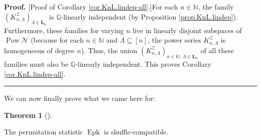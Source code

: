 \documentclass[numbers=enddot,12pt,final,onecolumn,notitlepage]{scrartcl}%
\theoremstyle{definition}
\newtheorem{theo}{Theorem}[section]
\newenvironment{theorem}[1][]
{\begin{theo}[#1]\begin{leftbar}}
{\end{leftbar}\end{theo}}
\newenvironment{proof}[1][Proof]{\noindent\textbf{#1.} }{\ \rule{0.5em}{0.5em}}
\newenvironment{verlong}{}{}
\newcommand{\NN}{\mathbb{N}}
\begin{document}
\begin{verlong}
\begin{proof}
[Proof of Corollary \ref{cor.KnL.lindep-all}.]For each $n\in\mathbb{N}$, the
family
$\left(  K_{n,\Lambda}^{\mathcal{Z}}\right)  _{\Lambda\in \mathbf{L}_n}$
is $\mathbb{Q}$-linearly
independent (by Proposition \ref{prop.KnL.lindep}). Furthermore, these
families for varying $n$ live in linearly disjoint subspaces of
$\operatorname*{Pow}\mathcal{N}$ (because for each $n \in \NN$ and $\Lambda
\subseteq\left[  n\right]  $, the power series $K_{n,\Lambda}^{\mathcal{Z}}$
is homogeneous of degree $n$). Thus, the union $\left(  K_{n,\Lambda
}^{\mathcal{Z}}\right)  _{n \in \NN;\ \Lambda \in \mathbf{L}_n}$ of all
these families must also be $\mathbb{Q}%
$-linearly independent.
This proves Corollary \ref{cor.KnL.lindep-all}.
\end{proof}
\end{verlong}

We can now finally prove what we came here for:

\begin{theorem}
\label{thm.Epk.sh-co-a}The permutation statistic $\operatorname{Epk}$ is shuffle-compatible.
\end{theorem}
\end{document}
